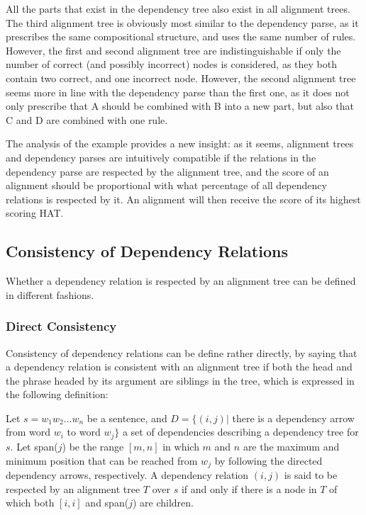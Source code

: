 All the parts that exist in the dependency tree also exist in all alignment trees. The third alignment tree is obviously most similar to the dependency parse, as it prescribes the same compositional structure, and uses the same number of rules. However, the first and second alignment tree are indistinguishable if only the number of correct (and possibly incorrect) nodes is considered, as they both contain two correct, and one incorrect node. However, the second alignment tree seems more in line with the dependency parse than the first one, as it does not only prescribe that A should be combined with B into a new part, but also that C and D are combined with one rule.

The analysis of the example provides a new insight: as it seems, alignment trees and dependency parses are intuitively compatible if the relations in the dependency parse are respected by the alignment tree, and the score of an alignment should be proportional with what percentage of all dependency relations is respected by it. An alignment will then receive the score of its highest scoring HAT.

\subsection{Consistency of Dependency Relations}

Whether a dependency relation is respected by an alignment tree can be defined in different fashions.

\subsubsection{Direct Consistency}

Consistency of dependency relations can be define rather directly, by saying that a dependency relation is consistent with an alignment tree if both the head and the phrase headed by its argument are siblings in the tree, which is expressed in the following definition:

\begin{definition}\label{def:depHAT}
Let $s = w_1 w_2 \dots w_n$ be a sentence, and $D = \{ (i,j) |$ there is a dependency arrow from word $w_i$ to word $w_j \}$ a set of dependencies describing a dependency tree for $s$. Let span($j$) be the range $[m,n]$ in which $m$ and $n$ are the maximum and minimum position that can be reached from $w_j$ by following the directed dependency arrows, respectively. A dependency relation $(i,j)$ is said to be respected by an alignment tree $T$ over $s$ if and only if there is a node in $T$ of which both $[i,i]$ and span($j$) are children.
\end{definition}

